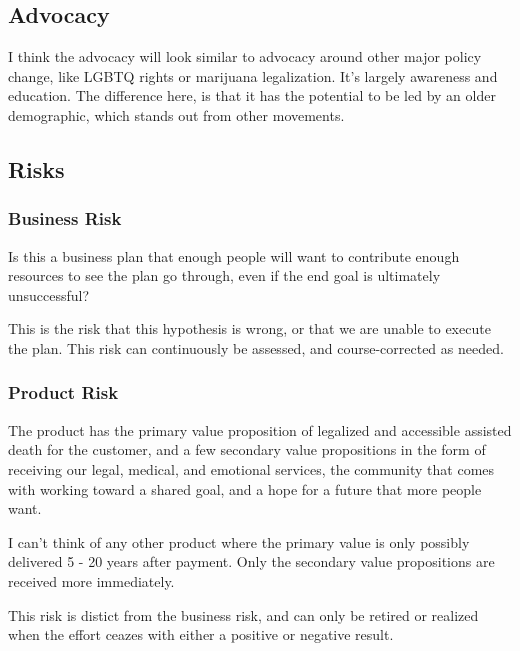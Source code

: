 \documentclass{proposalnsf}
\begin{document}
\subsection{Advocacy}
I think the advocacy will look similar to advocacy around other major policy change, like LGBTQ rights or marijuana legalization. It's largely awareness and education. The difference here, is that it has the potential to be led by an older demographic, which stands out from other movements.

\subsection{Risks}
\subsubsection{Business Risk}
Is this a business plan that enough people will want to contribute enough resources to see the plan go through, even if the end goal is ultimately unsuccessful?

This is the risk that this hypothesis is wrong, or that we are unable to execute the plan.
This risk can continuously be assessed, and course-corrected as needed.

\subsubsection{Product Risk}
The product has the primary value proposition of legalized and accessible assisted death for the customer, and a few secondary value propositions in the form of receiving our legal, medical, and emotional services, the community that comes with working toward a shared goal, and a hope for a future that more people want.

I can't think of any other product where the primary value is only possibly delivered 5 - 20 years after payment. 
Only the secondary value propositions are received more immediately. 

This risk is distict from the business risk, and can only be retired or realized when the effort ceazes with either a positive or negative result. 



\newpage
{}
\renewcommand{\thepage} {E--\arabic{page}}



\newpage
{}
\renewcommand{\thepage} {G--\arabic{page}}
\end{document}
